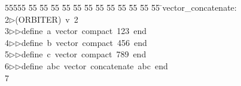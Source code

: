%
%
\begin{tabbing}
55555 \= 55 \= 55 \= 55 \= 55 \= 55 \= 55 \= 55 \= 55 \= 55 \= 55 \= 55 \= 55 \= \>vector\_concatenate:\\[0pt]
2\>$\triangleright$\>(ORBITER)\ v\ 2\ \\[0pt]
3\>$\triangleright$\>$\triangleright$\>define\ a\ vector\ compact\ 123\ end\ \\[0pt]
4\>$\triangleright$\>$\triangleright$\>define\ b\ vector\ compact\ 456\ end\ \\[0pt]
5\>$\triangleright$\>$\triangleright$\>define\ c\ vector\ compact\ 789\ end\ \\[0pt]
6\>$\triangleright$\>$\triangleright$\>define\ abc\ vector\ concatenate\ abc\ end\\[0pt]
7\>\end{tabbing}
